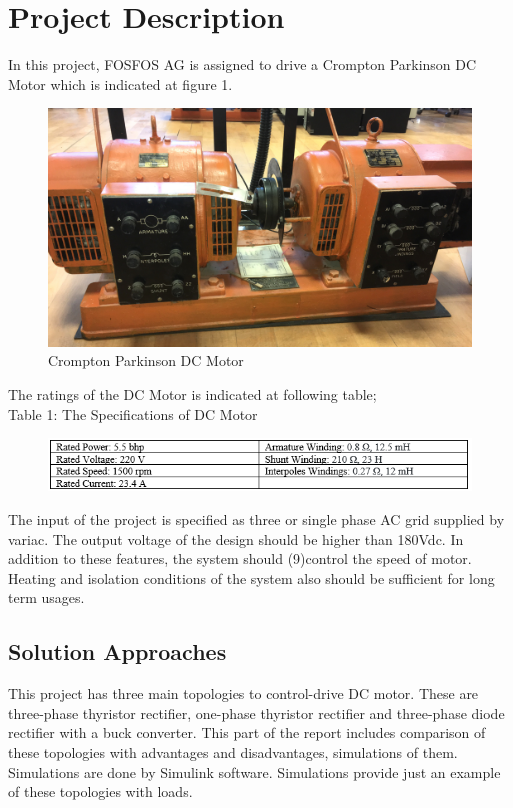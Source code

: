 \documentclass{article}
\begin{document}
\section{Project Description}
In this project, FOSFOS AG is assigned to drive a Crompton Parkinson DC Motor which is indicated at figure 1. 
\begin{figure}[h!]
\centering
\includegraphics[scale=0.10]{motorsetup}
\caption{Crompton Parkinson DC Motor }
\label{fig:members}
\end{figure} 

The ratings of the DC Motor is indicated at following table;\\
\noindent Table 1: The Specifications of DC Motor
\begin{figure}[h!]
\centering
\includegraphics[scale=0.8]{motordetay}
\label{fig:members}
\end{figure} 

The input of the project is specified as three or single phase AC grid supplied by variac. The output voltage of the design should be higher than 180Vdc. In addition to these features, the system should (9)control the speed of motor. Heating and isolation conditions of the system also should be sufficient for long term usages. 

\subsection{Solution Approaches}%
This project has three main topologies to control-drive DC motor. These are three-phase thyristor rectifier, one-phase thyristor rectifier and three-phase diode rectifier with a buck converter. This part of the report includes comparison of these topologies with advantages and disadvantages, simulations of them. Simulations are done by Simulink software. Simulations provide just an example of these topologies with loads.
\end{document}
